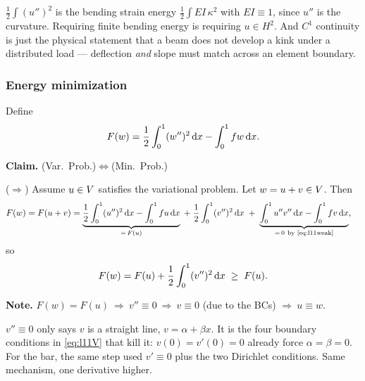 \begin{mechanics}
$\tfrac12\int(u'')^{2}$ is the bending strain energy $\tfrac12\int EI\,\kappa^{2}$
with $EI\equiv1$, since $u''$ is the curvature. Requiring finite bending energy
is requiring $u\in H^{2}$. And $C^{1}$ continuity is just the physical statement
that a beam does not develop a kink under a distributed load --- deflection
\emph{and} slope must match across an element boundary.
\end{mechanics}

\subsubsection*{Energy minimization}

Define
\begin{equation}\label{eq:l11F}
  F(w)=\frac12\int_0^1(w'')^{2}\,\mathrm{d} x-\int_0^1 f w\,\mathrm{d} x .
\end{equation}

\noindent{}

\medskip\noindent
\textbf{Claim.} (Var.\ Prob.)\;$\Longleftrightarrow$\;(Min.\ Prob.)

\medskip\noindent
($\Longrightarrow$) Assume $u\in V$ satisfies the variational problem. Let
$w=u+v\in V$. Then
\begin{align}
  F(w)=F(u+v)&=\underbrace{\frac12\int_0^1(u'')^{2}\,\mathrm{d} x-\int_0^1 fu\,\mathrm{d} x}_{=\,F(u)}
    \;+\;\frac12\int_0^1(v'')^{2}\,\mathrm{d} x
    \;+\;\underbrace{\int_0^1 u''v''\,\mathrm{d} x-\int_0^1 f v\,\mathrm{d} x}_{=\,0\ \text{by \eqref{eq:l11weak}}},
    \label{eq:l11expand}
\end{align}
so
\begin{equation}\label{eq:l11FwFu}
  F(w)=F(u)+\frac12\int_0^1(v'')^{2}\,\mathrm{d} x\;\ge\;F(u).
\end{equation}

\medskip\noindent
\textbf{Note.} $F(w)=F(u)\ \Rightarrow\ v''\equiv0\ \Rightarrow\ v\equiv0$
(due to the BCs) $\Rightarrow\ u\equiv w$.

\begin{intuition}
$v''\equiv0$ only says $v$ is a straight line, $v=\alpha+\beta x$. It is the
four boundary conditions in \eqref{eq:l11V} that kill it: $v(0)=v'(0)=0$ already
force $\alpha=\beta=0$. For the bar, the same step used $v'\equiv0$ plus the two
Dirichlet conditions. Same mechanism, one derivative higher.
\end{intuition}

